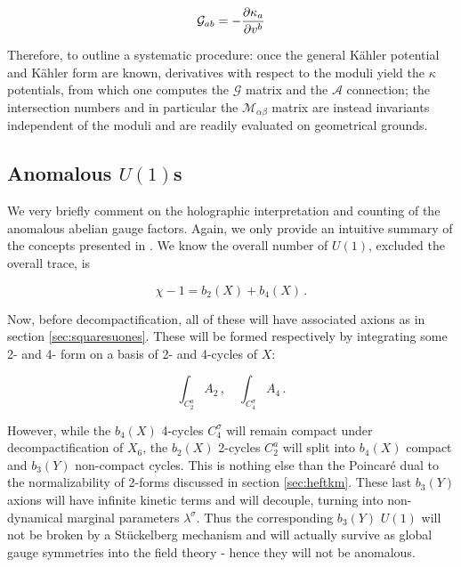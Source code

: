 \begin{equation}
	\mathcal{G}_{ab} = - \frac{\partial\kappa_a}{\partial v^b}
	\label{Gshortcut}
\end{equation}

Therefore, to outline a systematic procedure: once the general K\"ahler potential and K\"ahler form are known, derivatives with respect to the moduli yield the $\kappa$ potentials, from which one computes the $\mathcal{G}$ matrix and the $\mathcal{A}$ connection; the intersection numbers and in particular the $\mathcal{M}_{\alpha\beta}$ matrix are instead invariants independent of the moduli and are readily evaluated on geometrical grounds.

\subsection{Anomalous $U(1)$s}

We very briefly comment on the holographic interpretation and counting of the anomalous abelian gauge factors. Again, we only provide an intuitive summary of the concepts presented in \cite{MZ}. We know the overall number of $U(1)$, excluded the overall trace, is

\begin{equation}
	\chi - 1 =  b_2(X) + b_4(X)\,.
	\label{}
\end{equation}

Now, before decompactification, all of these will have associated axions as in section \ref{sec:squaresuones}. These will be formed respectively by integrating some 2- and 4- form on a basis of 2- and 4-cycles of $X$:


\begin{equation}
	\int_{\mbox{$C_2^a$}} A_2\,,\quad \int_{\mbox{$C_4^\sigma$}} A_4\,.
	\label{}
\end{equation}

However, while the $b_4(X)$ 4-cycles $C_4^\sigma$ will remain compact under decompactification of $X_6$, the $b_2(X)$ 2-cycles $C_2^a$ will split into $b_4(X)$ compact and $b_3(Y)$ non-compact cycles. This is nothing else than the Poincar\'e dual to the normalizability of 2-forms discussed in section \ref{sec:heftkm}. These last $b_3(Y)$ axions will have infinite kinetic terms and will decouple, turning into non-dynamical marginal parameters $\lambda^\sigma$. Thus the corresponding $b_3(Y)$ $U(1)$ will not be broken by a St\"uckelberg mechanism and will actually survive as global gauge symmetries into the field theory - hence they will not be anomalous.


